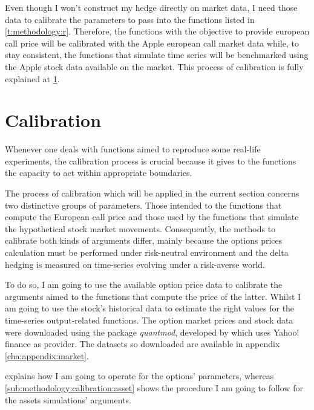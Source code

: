 \documentclass[12pt]{report}
\begin{document}
Even though I won't construct my hedge directly on market data, I need those data to calibrate the parameters to pass into the functions listed in \cref{t:methodology:r}.
Therefore, the functions with the objective to provide european call price will be calibrated with the Apple european call market data while, to stay consistent, the functions that simulate time series will be benchmarked using the Apple stock data available on the market.
This process of calibration is fully explained at \cref{sec:methodology:calibration}.


\section{Calibration}
\label{sec:methodology:calibration}

Whenever one deals with functions aimed to reproduce some real-life experiments, the calibration process is crucial because it gives to the functions the capacity to act within appropriate boundaries.

The process of calibration which will be applied in the current section concerns two distinctive groups of parameters. 
Those intended to the functions that compute the European call price and those used by the functions that simulate the hypothetical stock market movements.
Consequently, the methods to calibrate both kinds of arguments differ, mainly because the options prices calculation must be performed under risk-neutral environment and the delta hedging is measured on time-series evolving under a risk-averse world.

To do so, I am going to use the available option price data to calibrate the arguments aimed to the functions that compute the price of the latter. 
Whilst I am going to use the stock's historical data to estimate the right values for the time-series output-related functions.
The option market prices and stock data were downloaded using the package \textit{quantmod}, developed by \citet{quantmod} which uses Yahoo! finance as provider. The datasets so downloaded are available in appendix \ref{cha:appendix:market}.

 explains how I am going to operate for the options' parameters, whereas \cref{sub:methodology:calibration:asset} shows the procedure I am going to follow for the assets simulations' arguments.
\end{document}
